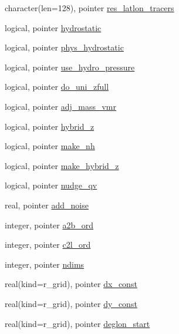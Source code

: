 \begin{DoxyCompactItemize}
character(len=128), pointer \hyperlink{classfv__control__mod_aa31278efd25dc639b4c0ca97f158a746}{res\-\_\-latlon\-\_\-tracers}
\item 
logical, pointer \hyperlink{classfv__control__mod_a253a9df8fc703d934789a380034b3124}{hydrostatic}
\item 
logical, pointer \hyperlink{classfv__control__mod_acb8e0fa14bd650f1480f4e06e3ef8db5}{phys\-\_\-hydrostatic}
\item 
logical, pointer \hyperlink{classfv__control__mod_a8adf373513e87e6f924b04c06a1f8e68}{use\-\_\-hydro\-\_\-pressure}
\item 
logical, pointer \hyperlink{classfv__control__mod_a0177940eab03249d9b347df15e5022bc}{do\-\_\-uni\-\_\-zfull}
\item 
logical, pointer \hyperlink{classfv__control__mod_ab60d2685b73f5240ec7042fa03eed5a5}{adj\-\_\-mass\-\_\-vmr}
\item 
logical, pointer \hyperlink{classfv__control__mod_acabdc7dc9152ee3102b9d5e3f5b0c83d}{hybrid\-\_\-z}
\item 
logical, pointer \hyperlink{classfv__control__mod_a86a0ab9a71b491d54a83213c3a9aeb9d}{make\-\_\-nh}
\item 
logical, pointer \hyperlink{classfv__control__mod_a3e80dbc93b095de51dab7baeca7c28c8}{make\-\_\-hybrid\-\_\-z}
\item 
logical, pointer \hyperlink{classfv__control__mod_ad7e3b542651cf836a315dcf36149256d}{nudge\-\_\-qv}
\item 
real, pointer \hyperlink{classfv__control__mod_a163f8e15e0a8c866b7983d6886314c07}{add\-\_\-noise}
\item 
integer, pointer \hyperlink{classfv__control__mod_acaa650e90ef998f47a632f0ee11740bd}{a2b\-\_\-ord}
\item 
integer, pointer \hyperlink{classfv__control__mod_ad022d95cf215a34772cae65cb436cf82}{c2l\-\_\-ord}
\item 
integer, pointer \hyperlink{classfv__control__mod_a4a79e8e5ca77c49a271741e59dfc9723}{ndims}
\item 
real(kind=r\-\_\-grid), pointer \hyperlink{classfv__control__mod_a1e8f42debd53f3900228b56386993ef4}{dx\-\_\-const}
\item 
real(kind=r\-\_\-grid), pointer \hyperlink{classfv__control__mod_a88f665268580524b485db484cc3b69ff}{dy\-\_\-const}
\item 
real(kind=r\-\_\-grid), pointer \hyperlink{classfv__control__mod_a18d2e658d7550cba86773f1b68e8369c}{deglon\-\_\-start}
\item 

\end{DoxyCompactItemize}
